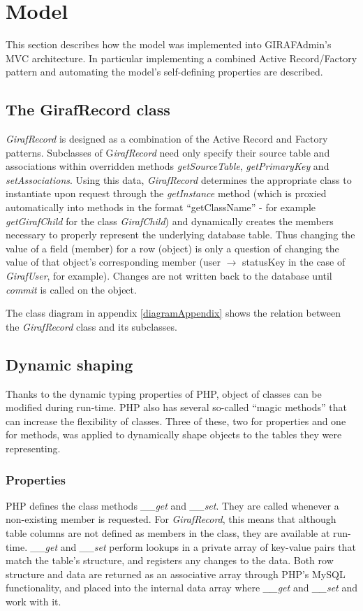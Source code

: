 \section{Model}
\label{model}
This section describes how the model was implemented into GIRAFAdmin's MVC architecture. In particular implementing a combined Active Record/Factory pattern and automating the model's self-defining properties are described.

\subsection{The GirafRecord class}
\emph{GirafRecord} is designed as a combination of the Active Record and Factory patterns. Subclasses of G\emph{irafRecord} need only specify their source table and associations within overridden methods \emph{getSourceTable}, \emph{getPrimaryKey} and \emph{setAssociations}. Using this data, \emph{GirafRecord} determines the appropriate class to instantiate upon request through the \emph{getInstance} method (which is proxied automatically into methods in the format ``getClassName'' - for example \emph{getGirafChild} for the class \emph{GirafChild}) and dynamically creates the members necessary to properly represent the underlying database table. Thus changing the value of a field (member) for a row (object) is only a question of changing the value of that object's corresponding member (user $\rightarrow$ statusKey in the case of \emph{GirafUser}, for example). Changes are not written back to the database until \emph{commit} is called on the object.

The class diagram in appendix \ref{diagramAppendix} shows the relation between the \emph{GirafRecord} class and its subclasses.

\subsection{Dynamic shaping}
Thanks to the dynamic typing properties of PHP, object of classes can be modified during run-time. PHP also has several so-called ``magic methods'' that can increase the flexibility of classes\cite{MagicMethods}. Three of these, two for properties and one for methods, was applied to dynamically shape objects to the tables they were representing.

\subsubsection*{Properties}
PHP defines the class methods \emph{\_\_get} and \emph{\_\_set}. They are called whenever a non-existing member is requested. For \emph{GirafRecord}, this means that although table columns are not defined as members in the class, they are available at run-time. \emph{\_\_get} and \emph{\_\_set} perform lookups in a private array of key-value pairs that match the table's structure, and registers any changes to the data.
Both row structure and data are returned as an associative array through PHP's MySQL functionality, and placed into the internal data array where \emph{\_\_get} and \emph{\_\_set} and work with it.

